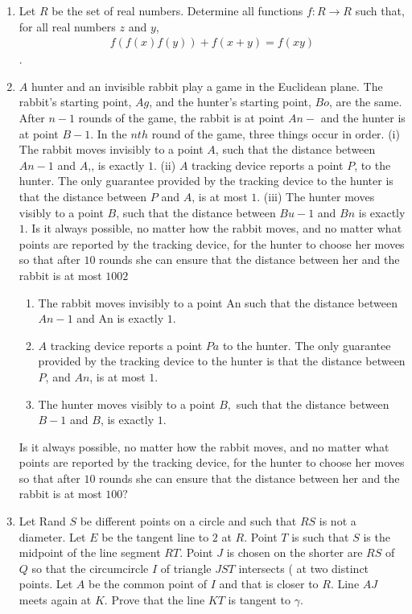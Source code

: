 \documentclass[12pt,-letter paper]{article}
\begin{document}
\begin{enumerate}
	
\item Let $R$ be the set of real numbers. Determine all functions $f:R\rightarrow R$ such that, for all real numbers $z$ and $y$, \begin{align}f(f(x)f(y))+f(x+y)=f(xy)\end{align}.
\item $A$ hunter and an invisible rabbit play a game in the Euclidean plane. The rabbit's starting point, $Ag$, and the hunter's starting point, $Bo$, are the same. After $n-1$ rounds of the game, the rabbit is at point $An-$ and the hunter is at point $B-1$. In the $nth$ round of the game, three things occur in order.                             (i) The rabbit moves invisibly to a point $A$, such that the distance between $An-1$ and $A$,, is exactly $1$.
(ii) $A$ tracking device reports a point $P$, to the hunter. The only guarantee provided by the tracking device to the hunter is that the distance between $P$ and $A$, is at most $1$.
(iii) The hunter moves visibly to a point $B$, such that the distance between $Bu-1$ and $Bn$ is exactly $1$. Is it always possible, no matter how the rabbit moves, and no matter what points are reported by the tracking device, for the hunter to choose her moves so that after $10$ rounds she can ensure that the distance between her and the rabbit is at most $1002$
\begin{enumerate}[label=(\roman*)]
	\item The rabbit moves invisibly to a point An such that the distance between $An-1$ and An is exactly $1$.
	\item $A$ tracking device reports a point $Pa$ to the hunter. The only guarantee provided by the tracking device to the hunter is that the distance between $P$, and $An$, is at most $1$.
	\item The hunter moves visibly to a point $B,$ such that the distance between $B-1$ and $B$, is exactly $1$.
\end{enumerate}
Is it always possible, no matter how the rabbit moves, and no matter what points are reported by the tracking device, for the hunter to choose her moves so that after $10$ rounds she can ensure that the distance between her and the rabbit is at most $100?$
\item Let Rand $S$ be different points on a circle and such that $RS$ is not a diameter. Let $E$ be the tangent line to $2$ at $R$. Point $T$ is such that $S$ is the midpoint of the line segment $RT$. Point $J$ is chosen on the shorter are $RS$ of $Q$ so that the circumcircle $I$ of triangle $JST$ intersects ( at two distinct points. Let $A$ be the common point of $I$ and that is closer to $R$. Line $AJ$ meets again at $K$. Prove that the line $KT$ is tangent to $\gamma$.

\end{enumerate}
\end{document}
